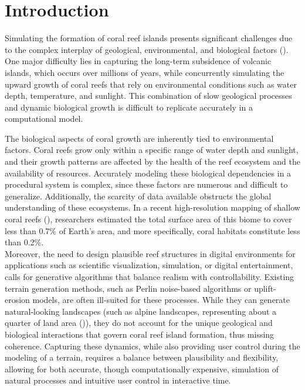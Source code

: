 \section{Introduction}

Simulating the formation of coral reef islands presents significant challenges due to the complex interplay of geological, environmental, and biological factors (\cite{Hopley2014}). One major difficulty lies in capturing the long-term subsidence of volcanic islands, which occurs over millions of years, while concurrently simulating the upward growth of coral reefs that rely on environmental conditions such as water depth, temperature, and sunlight. This combination of slow geological processes and dynamic biological growth is difficult to replicate accurately in a computational model.

The biological aspects of coral growth are inherently tied to environmental factors. Coral reefs grow only within a specific range of water depth and sunlight, and their growth patterns are affected by the health of the reef ecosystem and the availability of resources. Accurately modeling these biological dependencies in a procedural system is complex, since these factors are numerous and difficult to generalize. Additionally, the scarcity of data available obstructs the global understanding of these ecosystems. In a recent high-resolution mapping of shallow coral reefs (\cite{Lyons2024}), researchers estimated the total surface area of this biome to cover less than 0.7\% of Earth's area, and more specifically, coral habitats constitute less than 0.2\%.  \\
\indent Moreover, the need to design plausible reef structures in digital environments for applications such as scientific visualization, simulation, or digital entertainment, calls for generative algorithms that balance realism with controllability. Existing terrain generation methods, such as Perlin noise-based algorithms or uplift-erosion models, are often ill-suited for these processes. While they can generate natural-looking landscapes (such as alpine landscapes, representing about a quarter of land area (\cite{Korner2014})), they do not account for the unique geological and biological interactions that govern coral reef island formation, thus missing coherence. Capturing these dynamics, while also providing user control during the modeling of a terrain, requires a balance between plausibility and flexibility, allowing for both accurate, though computationally expensive, simulation of natural processes and intuitive user control in interactive time.

